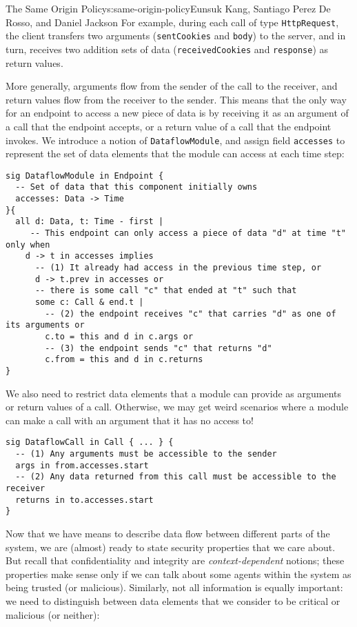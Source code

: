 \begin{aosachapter}{The Same Origin Policy}{s:same-origin-policy}{Eunsuk Kang, Santiago Perez De Rosso, and Daniel Jackson}
For example, during each call of type \texttt{HttpRequest}, the client
transfers two arguments (\texttt{sentCookies} and \texttt{body}) to the
server, and in turn, receives two addition sets of data
(\texttt{receivedCookies} and \texttt{response}) as return values.

More generally, arguments flow from the sender of the call to the
receiver, and return values flow from the receiver to the sender. This
means that the only way for an endpoint to access a new piece of data is
by receiving it as an argument of a call that the endpoint accepts, or a
return value of a call that the endpoint invokes. We introduce a notion
of \texttt{DataflowModule}, and assign field \texttt{accesses} to
represent the set of data elements that the module can access at each
time step:

\begin{verbatim}
sig DataflowModule in Endpoint {
  -- Set of data that this component initially owns
  accesses: Data -> Time
}{
  all d: Data, t: Time - first |
     -- This endpoint can only access a piece of data "d" at time "t" only when
    d -> t in accesses implies
      -- (1) It already had access in the previous time step, or
      d -> t.prev in accesses or
      -- there is some call "c" that ended at "t" such that
      some c: Call & end.t |
        -- (2) the endpoint receives "c" that carries "d" as one of its arguments or
        c.to = this and d in c.args or
        -- (3) the endpoint sends "c" that returns "d" 
        c.from = this and d in c.returns 
}
\end{verbatim}

We also need to restrict data elements that a module can provide as
arguments or return values of a call. Otherwise, we may get weird
scenarios where a module can make a call with an argument that it has no
access to!

\begin{verbatim}
sig DataflowCall in Call { ... } {
  -- (1) Any arguments must be accessible to the sender
  args in from.accesses.start
  -- (2) Any data returned from this call must be accessible to the receiver
  returns in to.accesses.start
}
\end{verbatim}

Now that we have means to describe data flow between different parts of
the system, we are (almost) ready to state security properties that we
care about. But recall that confidentiality and integrity are
\emph{context-dependent} notions; these properties make sense only if we
can talk about some agents within the system as being trusted (or
malicious). Similarly, not all information is equally important: we need
to distinguish between data elements that we consider to be critical or
malicious (or neither):


\end{aosachapter}
